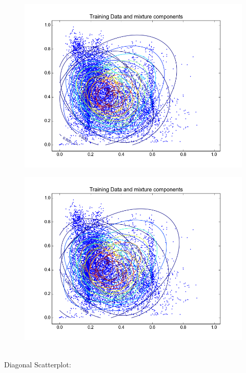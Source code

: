 \documentclass[11pt,a4paper]{article}
\begin{document}
\begin{minipage}[b]{0.25\textwidth}
\begin{figure}[H]
  \centering
  \includegraphics[width=.8\linewidth]{Figures/contoursforest15.png}

  \label{fig:sfig1}
\end{figure}%
\end{minipage}
\begin{minipage}[b]{0.25\textwidth}
\begin{figure}[H]
  \centering
  \includegraphics[width=.8\linewidth]{Figures/contoursforest30.png}

  \label{fig:sfig1}
\end{figure}%
\end{minipage}
\\
Diagonal Scatterplot: \\
\end{document}
